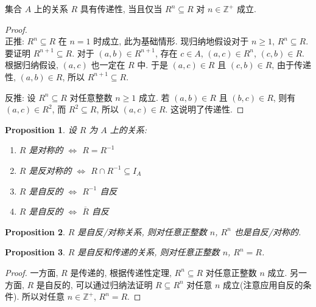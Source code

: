 \documentclass[UTF8]{ctexart}
\theoremstyle{mystyle}
\newtheorem{proposition}{Proposition}[section]
\theoremstyle{myremark}
\theoremstyle{plain}
\newcommand{\Z}{\mathbb Z}
\begin{document}
\begin{theorem}
    集合 $ A $ 上的关系 $ R $ 具有传递性, 当且仅当 $ R^n \subseteq R $ 对 $ n \in \Z^+ $ 成立.
\end{theorem}

\begin{proof} \ \\
    正推: $ R^n \subseteq R $ 在 $ n = 1 $ 时成立, 此为基础情形. 现归纳地假设对于 $ n \geqslant 1 $, $ R^n \subseteq R $. 要证明 $ R^{n + 1} \subseteq R $. 对于 $ (a, b) \in R^{n + 1} $, 存在 $ c \in A $, $ (a, c) \in R^n $, $ (c, b) \in R $. 根据归纳假设, $ (a, c) $ 也一定在 $ R $ 中. 于是 $ (a, c) \in R $ 且 $ (c, b) \in R $, 由于传递性, $ (a, b) \in R $, 所以 $ R^{n + 1} \subseteq R $.
    
    反推: 设 $ R^n \subseteq R $ 对任意整数 $ n \geqslant 1 $ 成立. 若 $ (a, b) \in R $ 且 $ (b, c) \in R $, 则有 $ (a, c) \in R^2 $, 而 $ R^2 \subseteq R $, 所以 $ (a, c) \in R $. 这说明了传递性.
\end{proof}


\begin{proposition}
    设 $ R $ 为 $ A $ 上的关系:
    \begin{enumerate}
        \item $ R $ 是对称的 $ \Longleftrightarrow $ $ R = R^{-1} $
        \item $ R $ 是反对称的 $ \Longleftrightarrow $ $ R \cap R^{-1} \subseteq I_A $
        \item $ R $ 是自反的 $ \Longleftrightarrow $ $ R^{-1} $ 自反
        \item $ R $ 是自反的 $ \Longleftrightarrow $ $ \overline R $ 自反
    \end{enumerate}
\end{proposition}

\begin{proposition}
    $ R $ 是自反/对称关系, 则对任意正整数 $ n $, $ R^n $ 也是自反/对称的.
\end{proposition}

\begin{proposition}
    $ R $ 是自反和传递的关系, 则对任意正整数 $ n $, $ R^n = R $.
\end{proposition}

\begin{proof}
    一方面, $ R $ 是传递的, 根据传递性定理, $ R^n \subseteq R $ 对任意正整数 $ n $ 成立. 另一方面, $ R $ 是自反的, 可以通过归纳法证明 $ R \subseteq R^n $ 对任意 $ n $ 成立(注意应用自反的条件). 所以对任意 $ n \in \Z^+ $, $ R^n = R $.
\end{proof}
\end{document}
